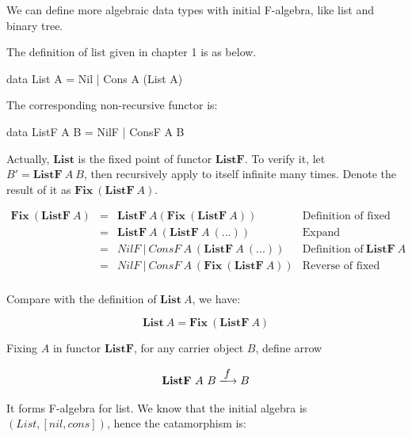 \documentclass[b5paper]{article}
\begin{document}
We can define more algebraic data types with initial F-algebra, like list and binary tree.

\begin{example}
\normalfont
The definition of list given in chapter 1 is as below.

\begin{Haskell}[frame = none]
data List A = Nil | Cons A (List A)
\end{Haskell}

The corresponding non-recursive functor is:

\begin{Haskell}[frame = none]
data ListF A B = NilF | ConsF A B
\end{Haskell}

Actually, $\mathbf{List}$ is the fixed point of functor $\mathbf{ListF}$. To verify it, let $B' = \mathbf{ListF}\ A\ B$, then recursively apply to itself infinite many times. Denote the result of it as $\mathbf{Fix}\ (\mathbf{ListF}\ A)$.

\[
\begin{array}{rcll}
\mathbf{Fix}\ (\mathbf{ListF}\ A)
& = & \mathbf{ListF}\ A (\mathbf{Fix}\ (\mathbf{ListF}\ A)) & \text{Definition of fixed point} \\
& = & \mathbf{ListF}\ A\ (\mathbf{ListF}\ A\ (...)) & \text{Expand} \\
& = & NilF\ |\ ConsF\ A\ (\mathbf{ListF}\ A\ (...)) & \text{Definition of}\ \mathbf{ListF}\ A \\
& = & NilF\ |\ ConsF\ A\ (\mathbf{Fix}\ (\mathbf{ListF}\ A)) & \text{Reverse of fixed point} \\
\end{array}
\]

Compare with the definition of $\mathbf{List}\ A$, we have:

\[
\mathbf{List}\ A = \mathbf{Fix}\ (\mathbf{ListF}\ A)
\]

Fixing $A$ in functor $\mathbf{ListF}$, for any carrier object $B$, define arrow

\[
\mathbf{ListF}\ A\ B \arrowto{f} B
\]

It forms F-algebra for list. We know that the initial algebra is $(List, [nil, cons])$, hence the catamorphism is:

\begin{center}
\end{center}


\end{example}
\end{document}
